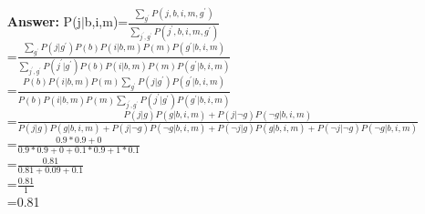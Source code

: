 \documentclass{article}
\begin{document}
\begin{itemize}
	\begin{itemize}
	\item[\textbf{Answer:}]P(j$\vert$b,i,m)=$\frac{\sum_{g^{'}}P(j,b,i,m,g^{'})}{\sum_{j^{'},g^{'}}P(j^{'},b,i,m,g^{'})}$\\=$\frac{\sum_{g^{'}}P(j\vert g^{'})P(b)P(i\vert b,m)P(m)P(g^{'}\vert b,i,m)}{\sum_{j^{'},g^{'}}P(j^{'}\vert g^{'})P(b)P(i\vert b,m)P(m)P(g^{'}\vert b,i,m)}$\\=$\frac{P(b)P(i\vert b,m)P(m)\sum_{g^{'}}P(j\vert g^{'})P(g^{'}\vert b,i,m)}{P(b)P(i\vert b,m)P(m)\sum_{j^{'},g^{'}}P(j^{'}\vert g^{'})P(g^{'}\vert b,i,m)}$\\=$\frac{P(j\vert g)P(g\vert b,i,m)+P(j\vert\neg g)P(\neg g\vert b,i,m)}{P(j\vert g)P(g\vert b,i,m)+P(j\vert\neg g)P(\neg g\vert b,i,m)+P(\neg j\vert g)P(g\vert b,i,m)+P(\neg j\vert\neg g)P(\neg g\vert b,i,m)}$\\=$\frac{0.9*0.9+0}{0.9*0.9+0+0.1*0.9+1*0.1}$\\=$\frac{0.81}{0.81+0.09+0.1}$\\=$\frac{0.81}{1}$\\=0.81
	\end{itemize}
\end{itemize}
\end{document}
